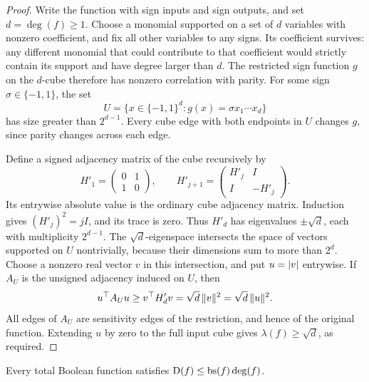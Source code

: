 \begin{proof}
Write the function with sign inputs and sign outputs, and set
$d=\deg(f)\ge1$. Choose a monomial supported on a set of $d$ variables
with nonzero coefficient, and fix all other variables to any signs.
Its coefficient survives: any different monomial that could contribute
to that coefficient would strictly contain its support and have degree
larger than $d$. The restricted sign function $g$ on the $d$-cube
therefore has nonzero correlation with parity. For some sign
$\sigma\in\{-1,1\}$, the set
\[
 U=\{x\in\{-1,1\}^d:g(x)=\sigma x_1\cdots x_d\}
\]
has size greater than $2^{d-1}$. Every cube edge with both endpoints in
$U$ changes $g$, since parity changes across each edge.

Define a signed adjacency matrix of the cube recursively by
\[
 H'_1=\begin{pmatrix}0&1\\1&0\end{pmatrix},
 \qquad
 H'_{j+1}=\begin{pmatrix}H'_j&I\\I&-H'_j\end{pmatrix}.
\]
Its entrywise absolute value is the ordinary cube adjacency matrix.
Induction gives $(H'_j)^2=jI$, and its trace is zero. Thus $H'_d$ has
eigenvalues $\pm\sqrt d$, each with multiplicity $2^{d-1}$. The
$\sqrt d$-eigenspace intersects the space of vectors supported on $U$
nontrivially, because their dimensions sum to more than $2^d$.
Choose a nonzero real vector $v$ in this intersection, and put
$u=\lvert v\rvert$ entrywise. If $A_U$ is the unsigned adjacency induced on
$U$, then
\[
 u^\top A_Uu\ge v^\top H'_dv=\sqrt d\,\lVert v\rVert^2
             =\sqrt d\,\lVert u\rVert^2.
\]
All edges of $A_U$ are sensitivity edges of the restriction, and hence
of the original function. Extending $u$ by zero to the full input
cube gives $\lambda(f)\ge\sqrt d$, as required.
\end{proof}

\begin{lemma}\label{lem:degree-bs}
Every total Boolean function satisfies
$\mathrm D(f)\le\operatorname{bs}(f)\deg(f)$.
\end{lemma}

